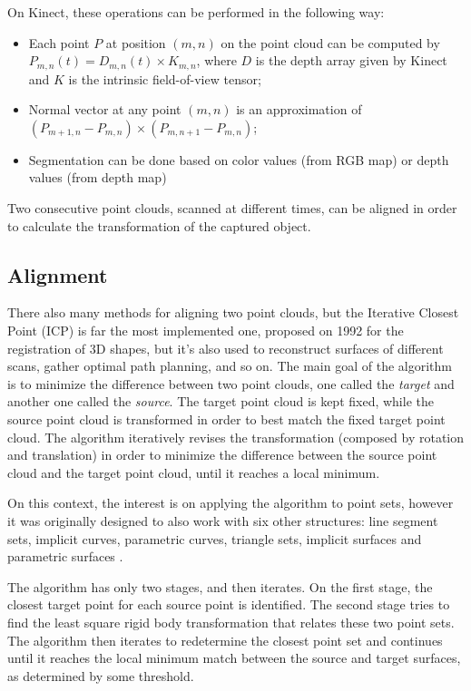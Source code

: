 \documentclass[msc, a4paper, classic, en]{ufbathesis}
\begin{document}
On Kinect, these operations can be performed in the following way:

\begin{itemize}
  \item Each point $P$ at position $(m, n)$ on the point cloud can be computed by $P_{m, n}(t) = D_{m, n}(t) \times K_{m, n}$, where $D$ is the depth array given by Kinect and $K$ is the intrinsic field-of-view tensor;
  \item Normal vector at any point $(m, n)$ is an approximation of $(P_{m+1, n} - P_{m,n}) \times (P_{m, n+1} - P_{m,n})$;
  \item Segmentation can be done based on color values (from RGB map) or depth values (from depth map)
\end{itemize}

Two consecutive point clouds, scanned at different times, can be aligned in order to calculate the transformation of the captured object.

\subsection{Alignment}

There also many methods for aligning two point clouds, but the Iterative Closest Point (ICP) \cite{icp} is far the most implemented one, proposed on 1992 for the registration of 3D shapes, but it's also used to reconstruct surfaces of different scans, gather optimal path planning, and so on. The main goal of the algorithm is to minimize the difference between two point clouds, one called the \textit{target} and another one called the \textit{source}. The target point cloud is kept fixed, while the source point cloud is transformed in order to best match the fixed target point cloud. The algorithm iteratively revises the transformation (composed by rotation and translation) in order to minimize the difference between the source point cloud and the target point cloud, until it reaches a local minimum.

On this context, the interest is on applying the algorithm to point sets, however it was originally designed to also work with six other structures: line segment sets, implicit curves, parametric curves, triangle sets, implicit surfaces and parametric surfaces \cite{hajnal2014medical}.

The algorithm has only two stages, and then iterates. On the first stage, the closest target point for each source point is identified. The second stage tries to find the least square rigid body transformation that relates these two point sets. The algorithm then iterates to redetermine the closest point set and continues until it reaches the local minimum match between the source and target surfaces, as determined by some threshold.
\end{document}
